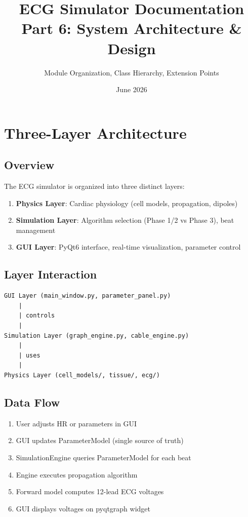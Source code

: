 \documentclass[11pt, a4paper]{article}
\title{ECG Simulator Documentation\\Part 6: System Architecture \& Design}
\author{Module Organization, Class Hierarchy, Extension Points}
\date{June 2026}
\begin{document}
\maketitle
\tableofcontents
\newpage

\section{Three-Layer Architecture}

\subsection{Overview}
The ECG simulator is organized into three distinct layers:

\begin{enumerate}
    \item \textbf{Physics Layer}: Cardiac physiology (cell models, propagation, dipoles)
    \item \textbf{Simulation Layer}: Algorithm selection (Phase 1/2 vs Phase 3), beat management
    \item \textbf{GUI Layer}: PyQt6 interface, real-time visualization, parameter control
\end{enumerate}

\subsection{Layer Interaction}

\begin{verbatim}
GUI Layer (main_window.py, parameter_panel.py)
    |
    | controls
    |
Simulation Layer (graph_engine.py, cable_engine.py)
    |
    | uses
    |
Physics Layer (cell_models/, tissue/, ecg/)
\end{verbatim}

\subsection{Data Flow}
\begin{enumerate}
    \item User adjusts HR or parameters in GUI
    \item GUI updates ParameterModel (single source of truth)
    \item SimulationEngine queries ParameterModel for each beat
    \item Engine executes propagation algorithm
    \item Forward model computes 12-lead ECG voltages
    \item GUI displays voltages on pyqtgraph widget
\end{enumerate}
\end{document}
